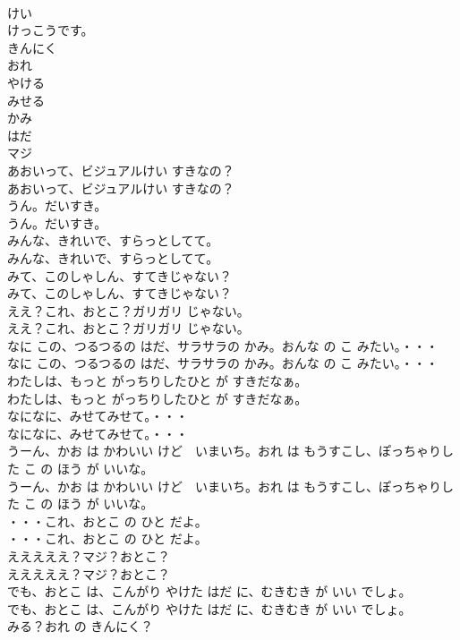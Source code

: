 \documentclass[8pt]{extreport}
\begin{document}
\begin{CJK}{UTF8}{min}
\\	けい
\\	けっこうです。
\\	きんにく
\\	おれ
\\	やける
\\	みせる
\\	かみ
\\	はだ
\\	マジ
\\	あおいって、ビジュアルけい すきなの？
\\	あおいって、ビジュアルけい すきなの？
\\	うん。だいすき。
\\	うん。だいすき。
\\	みんな、きれいで、すらっとしてて。
\\	みんな、きれいで、すらっとしてて。
\\	みて、このしゃしん、すてきじゃない？
\\	みて、このしゃしん、すてきじゃない？
\\	ええ？これ、おとこ？ガリガリ じゃない。
\\	ええ？これ、おとこ？ガリガリ じゃない。
\\	なに この、つるつるの はだ、サラサラの かみ。おんな の こ みたい。・・・
\\	なに この、つるつるの はだ、サラサラの かみ。おんな の こ みたい。・・・
\\	わたしは、もっと がっちりしたひと が すきだなぁ。
\\	わたしは、もっと がっちりしたひと が すきだなぁ。
\\	なになに、みせてみせて。・・・
\\	なになに、みせてみせて。・・・
\\	うーん、かお は かわいい けど　いまいち。おれ は もうすこし、ぽっちゃりした こ の ほう が いいな。
\\	うーん、かお は かわいい けど　いまいち。おれ は もうすこし、ぽっちゃりした こ の ほう が いいな。
\\	・・・これ、おとこ の ひと だよ。
\\	・・・これ、おとこ の ひと だよ。
\\	えええええ？マジ？おとこ？
\\	えええええ？マジ？おとこ？
\\	でも、おとこ は、こんがり やけた はだ に、むきむき が いい でしょ。
\\	でも、おとこ は、こんがり やけた はだ に、むきむき が いい でしょ。
\\	みる？おれ の きんにく？

\end{CJK}
\end{document}
